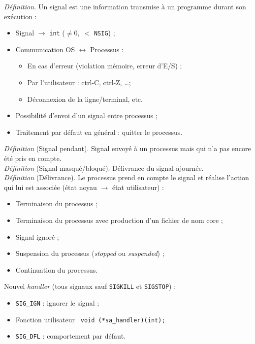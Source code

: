 \documentclass[french]{scrartcl}
\begin{document}
\begin{multicols}{3}
\clearpage
\vskip 10pt
\emph{Définition.} Un signal est une information transmise à un programme durant son exécution :\begin{itemize}
	\item Signal $\rightarrow$ \lstinline!int! ($\neq 0,\; <$ \lstinline!NSIG!) ;
	\item Communication OS $\leftrightarrow$ Processus :\begin{itemize}
		\item En cas d'erreur (violation mémoire, erreur d'E/S) ;
		\item Par l'utilisateur : ctrl-C, ctrl-Z, \dots ;
		\item Déconnexion de la ligne/terminal, etc.
	\end{itemize}
	\item Possibilité d'envoi d'un signal entre processus ;
	\item Traitement par défaut en général : quitter le processus.
\end{itemize}


\emph{Définition} (Signal pendant). Signal envoyé à un processus mais qui n'a pas encore été pris en compte.\\
\emph{Définition} (Signal masqué/bloqué). Délivrance du signal ajournée.\\
\emph{Définition} (Délivrance). Le processus prend en compte le signal et réalise l’action qui lui est associée (état noyau $\rightarrow$ état utilisateur) :\begin{itemize}
	\item Terminaison du processus ;
	\item Terminaison du processus avec production d’un fichier de nom core ;
	\item Signal ignoré ;
	\item Suspension du processus (\emph{stopped} ou \emph{suspended}) ;
	\item Continuation du processus.
\end{itemize}

Nouvel \emph{handler} (tous signaux sauf \lstinline!SIGKILL! et \lstinline!SIGSTOP!)  :\begin{itemize}
	\item \lstinline!SIG_IGN! : ignorer le signal ;
	\item Fonction utilisateur \lstinline! void (*sa_handler)(int);!
	\item \lstinline!SIG_DFL! : comportement par défaut.
\end{itemize}


\end{multicols}
\end{document}
